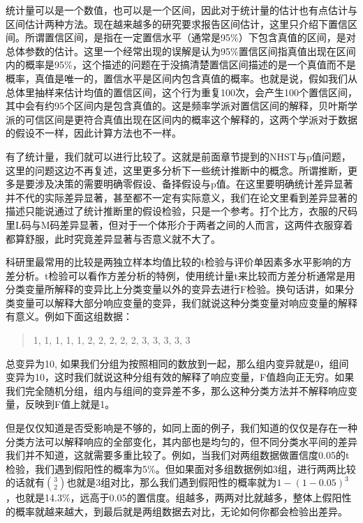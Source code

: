 \documentclass[]{tufte-book}
\begin{document}
统计量可以是一个数值，也可以是一个区间，因此对于统计量的估计也有点估计与区间估计两种方法。现在越来越多的研究要求报告区间估计，这里只介绍下置信区间。所谓置信区间，是指在一定置信水平（通常是95\%）下包含真值的区间，是对总体参数的估计。这里一个经常出现的误解是认为95\%置信区间指真值出现在区间内的概率是95\%，这个描述的问题在于没搞清楚置信区间描述的是一个真值而不是概率，真值是唯一的，置信水平是区间内包含真值的概率。也就是说，假如我们从总体里抽样来估计均值的置信区间，这个行为重复100次，会产生100个置信区间，其中会有约95个区间内是包含真值的。这是频率学派对置信区间的解释，贝叶斯学派的可信区间是更符合真值出现在区间内的概率这个解释的，这两个学派对于数据的假设不一样，因此计算方法也不一样。

有了统计量，我们就可以进行比较了。这就是前面章节提到的NHST与p值问题，这里的问题这边不再复述，这里更多分析下一些统计推断中的概念。所谓推断，更多是要涉及决策的需要明确零假设、备择假设与p值。在这里要明确统计差异显著并不代的实际差异显著，甚至都不一定有实际意义，我们在论文里看到差异显著的描述只能说通过了统计推断里的假设检验，只是一个参考。打个比方，衣服的尺码里L码与M码差异显著，但对于一个体形介于两者之间的人而言，这两件衣服穿着都算舒服，此时究竟差异显著与否意义就不大了。

科研里最常用的比较是两独立样本均值比较的t检验与评价单因素多水平影响的方差分析。t检验可以看作方差分析的特例，使用统计量t来比较而方差分析通常是用分类变量所解释的变异比上分类变量以外的变异去进行F检验。换句话讲，如果分类变量可以解释大部分响应变量的变异，我们就说这种分类变量对响应变量的解释有意义。例如下面这组数据：

\begin{quote}
1, 1, 1, 1, 1, 2, 2, 2, 2, 2, 3, 3, 3, 3, 3
\end{quote}

总变异为10, 如果我们分组为按照相同的数放到一起，那么组内变异就是0，组间变异为10，这时我们就说这种分组有效的解释了响应变量，F值趋向正无穷。如果我们完全随机分组，组内与组间的变异差不多，那么这种分类方法并不解释响应变量，反映到F值上就是1。

但是仅仅知道是否受影响是不够的，如同上面的例子，我们知道的仅仅是存在一种分类方法可以解释响应的全部变化，其内部也是均匀的，但不同分类水平间的差异我们并不知道，这就需要多重比较了。例如，当我们对两组数据做置信度0.05的t检验，我们遇到假阳性的概率为5\%。但如果面对多组数据例如3组，进行两两比较的话就有\(3\choose2\)也就是3组对比，那么我们遇到假阳性的概率就为\(1-(1-0.05)^3\)，也就是14.3\%，远高于0.05的置信度。组越多，两两对比就越多，整体上假阳性的概率就越来越大，到最后就是两组数据去对比，无论如何你都会检验出差异。
\end{document}
